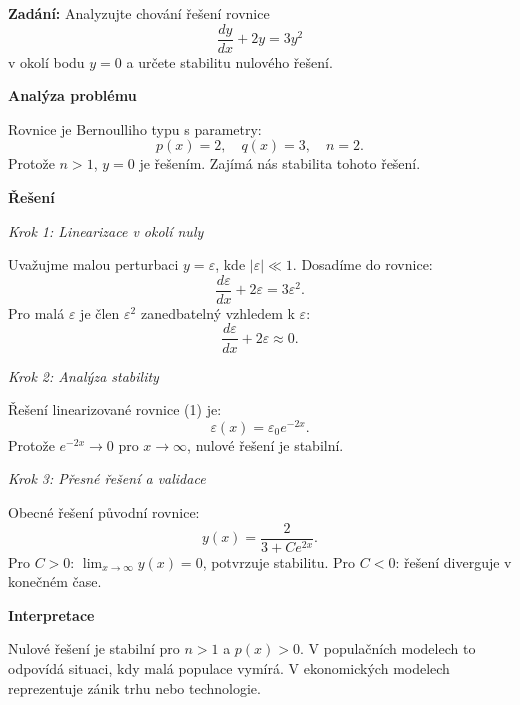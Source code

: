 \begin{example}
\label{ex:b1-nulove-reseni}

\noindent\textbf{Zadání:} Analyzujte chování řešení rovnice
\[
\frac{dy}{dx} + 2y = 3y^2
\]
v okolí bodu $y = 0$ a určete stabilitu nulového řešení.

\vspace{1.5\baselineskip}

\noindent\textbf{Analýza problému}

\noindent Rovnice je Bernoulliho typu s parametry:
\[
p(x) = 2, \quad q(x) = 3, \quad n = 2.
\]
Protože $n > 1$, $y = 0$ je řešením. Zajímá nás stabilita tohoto řešení.

\vspace{1.5\baselineskip}

\noindent\textbf{Řešení}

\noindent\textit{Krok 1: Linearizace v okolí nuly}

Uvažujme malou perturbaci $y = \varepsilon$, kde $|\varepsilon| \ll 1$. Dosadíme do rovnice:
\[
\frac{d\varepsilon}{dx} + 2\varepsilon = 3\varepsilon^2.
\]
Pro malá $\varepsilon$ je člen $\varepsilon^2$ zanedbatelný vzhledem k $\varepsilon$:
\[
\frac{d\varepsilon}{dx} + 2\varepsilon \approx 0. \tag{1}
\]

\noindent\textit{Krok 2: Analýza stability}

Řešení linearizované rovnice (1) je:
\[
\varepsilon(x) = \varepsilon_0 e^{-2x}.
\]
Protože $e^{-2x} \to 0$ pro $x \to \infty$, nulové řešení je stabilní.

\noindent\textit{Krok 3: Přesné řešení a validace}

Obecné řešení původní rovnice:
\[
y(x) = \frac{2}{3 + Ce^{2x}}.
\]
Pro $C > 0$: $\lim_{x \to \infty} y(x) = 0$, potvrzuje stabilitu.
Pro $C < 0$: řešení diverguje v konečném čase.

\vspace{1.5\baselineskip}

\noindent\textbf{Interpretace}

Nulové řešení je stabilní pro $n > 1$ a $p(x) > 0$. V populačních modelech to odpovídá 
situaci, kdy malá populace vymírá. V ekonomických modelech reprezentuje zánik trhu nebo 
technologie.

\end{example}

\vspace{2\baselineskip}

